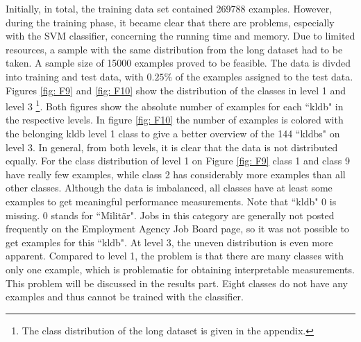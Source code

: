 \documentclass[12pt, a4paper, titlepage]{article}
\begin{document}
Initially, in total, the training data set contained 269788 examples. However, during the training phase, it became clear that there are problems, especially with the \ac{SVM} classifier, concerning the running time and memory. Due to limited resources, a sample with the same distribution from the long dataset had to be taken. A sample size of 15000 examples proved to be feasible. The data is divded into training and test data, with $0.25\%$ of the examples assigned to the test data. Figures \ref{fig: F9} and \ref{fig: F10} show the distribution of the classes in level 1 and level 3 \footnote{The class distribution of the long dataset is given in the appendix.}. Both figures show the absolute number of examples for each ``kldb" in the respective levels. In figure \ref{fig: F10} the number of examples is colored with the belonging kldb level 1 class to give a better overview of the 144 ``kldbs" on level 3. In general, from both levels, it is clear that the data is not distributed equally. For the class distribution of level 1 on Figure \ref{fig: F9} class 1 and class 9 have really few examples, while class 2 has considerably more examples than all other classes. Although the data is imbalanced, all classes have at least some examples to get meaningful performance measurements. Note that ``kldb" 0  is missing. 0 stands for ``Militär". Jobs in this category are generally not posted frequently on the Employment Agency Job Board page, so it was not possible to get examples for this ``kldb". At level 3, the uneven distribution is even more apparent. Compared to level 1, the problem is that there are many classes with only one example, which is problematic for obtaining interpretable measurements. This problem will be discussed in the results part. Eight classes do not have any examples and thus cannot be trained with the classifier.   
\end{document}
